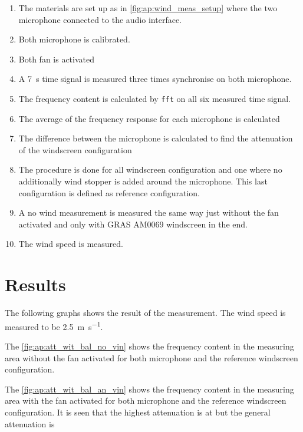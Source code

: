 \begin{enumerate}
\item The materials are set up as in \autoref{fig:ap:wind_meas_setup} where the two microphone connected to the audio interface.
\item Both microphone is calibrated.
\item Both fan is activated 
\item A \SI{7}{\second} time signal is measured three times synchronise on both microphone.
\item The frequency content is calculated by \texttt{fft} on all six measured time signal.
\item The average of the frequency response for each microphone is calculated
\item The difference between the microphone is calculated to find the attenuation of the windscreen configuration
\item The procedure is done for all windscreen configuration and one where no additionally wind stopper is added around the microphone. This last configuration is defined as reference configuration.
\item A no wind measurement is measured the same way just without the fan activated and only with GRAS AM0069 windscreen in the end.
\item The wind speed is measured.
\end{enumerate}

\section*{Results}

The following graphs shows the result of the measurement. The wind speed is measured to be \SI{2.5}{\meter\per\second}. 




The \autoref{fig:ap:att_wit_bal_no_vin} shows the frequency content in the measuring area without the fan activated for both microphone and the reference windscreen configuration.

The \autoref{fig:ap:att_wit_bal_an_vin} shows the frequency content in the measuring area with the fan activated for both microphone and the reference windscreen configuration. It is seen that the highest attenuation is at  but the general attenuation is 



